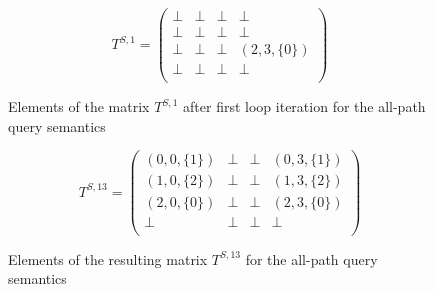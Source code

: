 {\small
	\begin{figure}[h]
		\[
		T^{S, 1} = \begin{pmatrix}
			\bot & \bot       & \bot & \bot       \\
			\bot & \bot & \bot       & \bot \\
			\bot       & \bot & \bot & (2, 3, \{0\}) \\
			\bot       & \bot & \bot & \bot \\
		\end{pmatrix}
		\]
		\caption{Elements of the matrix $T^{S, 1}$ after first loop iteration for the all-path query semantics}
		\label{ExampleQueryFirstIterationAll}
	\end{figure}
}

{\small
	\begin{figure}[h]
		\[
		T^{S, 13} = \begin{pmatrix}
			(0, 0, \{1\}) & \bot       & \bot & (0, 3, \{1\})       \\
			(1, 0, \{2\}) & \bot & \bot       & (1, 3, \{2\}) \\
			(2, 0, \{0\})       & \bot & \bot & (2, 3, \{0\}) \\
			\bot       & \bot & \bot & \bot \\
		\end{pmatrix}
		\]
		\caption{Elements of the resulting matrix $T^{S, 13}$ for the all-path query semantics}
		\label{ExampleQueryFinalMatricesAll}
	\end{figure}
}

